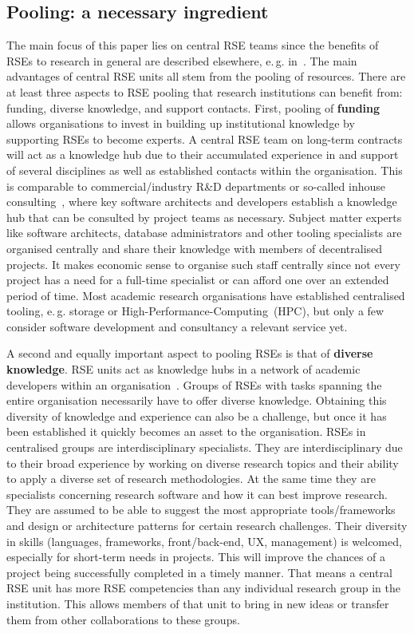 \documentclass[a4paper]{article}
\makeatletter
\newcommand*{\eg}{e.\,g.\@\xspace}
\makeatother
\begin{document}
\subsection{Pooling: a necessary ingredient}
The main focus of this paper lies on central RSE teams since the benefits of RSEs to research in general are described elsewhere, \eg{} in~\autocite{Anzt2021}.
The main advantages of central RSE units all stem from the pooling of resources.
There are at least three aspects to RSE pooling that research institutions can benefit from: funding, diverse knowledge, and support contacts.
First, pooling of \textbf{funding} allows organisations to invest in building up institutional knowledge by supporting RSEs to become experts.
A central RSE team on long-term contracts will act as a knowledge hub due to their accumulated experience in and support of several disciplines as well as established contacts within the organisation.
This is comparable to commercial/industry R\&D departments or so-called inhouse consulting~\autocite{Grima_2011}, where key software architects and developers establish a knowledge hub that can be consulted by project teams as necessary.
Subject matter experts like software architects, database administrators and other tooling specialists are organised centrally and share their knowledge with members of decentralised projects.
It makes economic sense to organise such staff centrally since not every project has a need for a full-time specialist or can afford one over an extended period of time.
Most academic research organisations have established centralised tooling, \eg{} storage or High-Performance-Computing\ (HPC), but only a few consider software development and consultancy a relevant service yet.

A second and equally important aspect to pooling RSEs is that of \textbf{diverse knowledge}.
RSE units act as knowledge hubs in a network of academic developers within an organisation~\autocite{Elsholz2006}.
Groups of RSEs with tasks spanning the entire organisation necessarily have to offer diverse knowledge.
Obtaining this diversity of knowledge and experience can also be a challenge, but once it has been established it quickly becomes an asset to the organisation.
RSEs in centralised groups are interdisciplinary specialists.
They are interdisciplinary due to their broad experience by working on diverse research topics and their ability to apply a diverse set of research methodologies.
At the same time they are specialists concerning research software and how it can best improve research.
They are assumed to be able to suggest the most appropriate tools/frameworks and design or architecture patterns for certain research challenges.
Their diversity in skills (languages, frameworks, front/back-end, UX, management) is welcomed, especially for short-term needs in projects.
This will improve the chances of a project being successfully completed in a timely manner.
That means a central RSE unit has more RSE competencies than any individual research group in the institution.
This allows members of that unit to bring in new ideas or transfer them from other collaborations to these groups.
\end{document}
